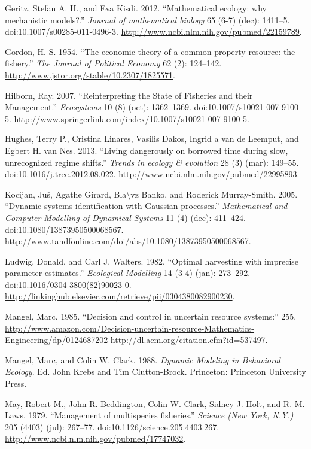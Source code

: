 \documentclass[author-year, review]{elsarticle} %
\begin{document}
Geritz, Stefan A. H., and Eva Kisdi. 2012. ``Mathematical ecology: why
mechanistic models?.'' \emph{Journal of mathematical biology} 65 (6-7)
(dec): 1411--5. doi:10.1007/s00285-011-0496-3.
\url{http://www.ncbi.nlm.nih.gov/pubmed/22159789}.

Gordon, H. S. 1954. ``The economic theory of a common-property resource:
the fishery.'' \emph{The Journal of Political Economy} 62 (2): 124--142.
\url{http://www.jstor.org/stable/10.2307/1825571}.

Hilborn, Ray. 2007. ``Reinterpreting the State of Fisheries and their
Management.'' \emph{Ecosystems} 10 (8) (oct): 1362--1369.
doi:10.1007/s10021-007-9100-5.
\url{http://www.springerlink.com/index/10.1007/s10021-007-9100-5}.

Hughes, Terry P., Cristina Linares, Vasilis Dakos, Ingrid a van de
Leemput, and Egbert H. van Nes. 2013. ``Living dangerously on borrowed
time during slow, unrecognized regime shifts.'' \emph{Trends in ecology
\& evolution} 28 (3) (mar): 149--55. doi:10.1016/j.tree.2012.08.022.
\url{http://www.ncbi.nlm.nih.gov/pubmed/22995893}.

Kocijan, Juš, Agathe Girard, Bla\textbackslash{}vz Banko, and Roderick
Murray-Smith. 2005. ``Dynamic systems identification with Gaussian
processes.'' \emph{Mathematical and Computer Modelling of Dynamical
Systems} 11 (4) (dec): 411--424. doi:10.1080/13873950500068567.
\url{http://www.tandfonline.com/doi/abs/10.1080/13873950500068567}.

Ludwig, Donald, and Carl J. Walters. 1982. ``Optimal harvesting with
imprecise parameter estimates.'' \emph{Ecological Modelling} 14 (3-4)
(jan): 273--292. doi:10.1016/0304-3800(82)90023-0.
\url{http://linkinghub.elsevier.com/retrieve/pii/0304380082900230}.

Mangel, Marc. 1985. ``Decision and control in uncertain resource
systems:'' 255.
\href{http://www.amazon.com/Decision-uncertain-resource-Mathematics-Engineering/dp/0124687202 http://dl.acm.org/citation.cfm?id=537497}{http://www.amazon.com/Decision-uncertain-resource-Mathematics-Engineering/dp/0124687202
http://dl.acm.org/citation.cfm?id=537497}.

Mangel, Marc, and Colin W. Clark. 1988. \emph{Dynamic Modeling in
Behavioral Ecology}. Ed. John Krebs and Tim Clutton-Brock. Princeton:
Princeton University Press.

May, Robert M., John R. Beddington, Colin W. Clark, Sidney J. Holt, and
R. M. Laws. 1979. ``Management of multispecies fisheries.''
\emph{Science (New York, N.Y.)} 205 (4403) (jul): 267--77.
doi:10.1126/science.205.4403.267.
\url{http://www.ncbi.nlm.nih.gov/pubmed/17747032}.
\end{document}
